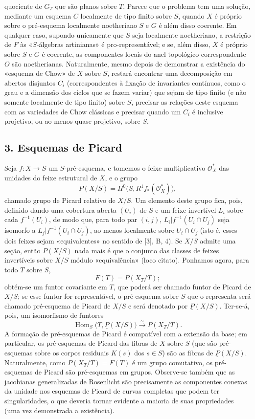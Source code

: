 \documentclass[11pt,twoside,openany]{book}
\numberwithin{equation}{section}
\newcommand{\src}[1]{%
  \phantomsection\hypertarget{src:#1}{}%
  \marginpar{\raggedleft\footnotesize\sffamily #1}%
}
\theoremstyle{plain}
\theoremstyle{definition}
\theoremstyle{remark}
\newcommand{\FgaUnitKey}{frontmatter}
\renewcommand{\src}[1]{%
  \phantomsection\hypertarget{src:\FgaUnitKey:#1}{}%
  \marginpar{\raggedleft\footnotesize\sffamily #1}%
}
\begin{document}
\src{383}
quociente de $G_T$ que são planos sobre $T$. Parece que o problema tem uma
solução, mediante um esquema $C$ localmente de tipo finito sobre $S$, quando
$X$ é próprio sobre o pré-esquema localmente noetheriano $S$ e $G$ é além disso
coerente. Em qualquer caso, supondo unicamente que $S$ seja localmente
noetheriano, a restrição de $F$ às «$S$-álgebras artinianas» é
pro-representável; e se, além disso, $X$ é próprio sobre $S$ e $G$ é coerente, as
componentes locais do anel topológico correspondente $O$ são
noetherianas. Naturalmente, mesmo depois de demonstrar a existência do
«esquema de Chow» de $X$ sobre $S$, restará
encontrar uma decomposição em abertos disjuntos $C_i$ (correspondentes à
fixação de invariantes contínuos, como o grau e a dimensão dos
ciclos que se fazem variar) que sejam de tipo finito (e não somente localmente de
tipo finito) sobre $S$, precisar as relações deste esquema com as
variedades de Chow clássicas e precisar quando um $C_i$ é inclusive projetivo,
ou ao menos quase-projetivo, sobre $S$.

\subsection*{3. Esquemas de Picard}

Seja $f:X\longrightarrow S$ um $S$-pré-esquema, e tomemos o feixe
multiplicativo $\mathcal O_X^*$ das unidades do feixe estrutural de $X$, e
o grupo
\[
  P(X/S)=H^0\bigl(S,R^1f_*(\mathcal O_X^*)\bigr),
\]
chamado grupo de Picard relativo de $X/S$. Um elemento deste grupo fica,
pois, definido dando uma cobertura aberta $(U_i)$ de $S$ e um feixe invertível
$L_i$ sobre cada $f^{-1}(U_i)$, de modo que, para todo par $(i,j)$,
$L_i|f^{-1}(U_i\cap U_j)$ seja isomorfo a $L_j|f^{-1}(U_i\cap U_j)$, ao menos
localmente sobre $U_i\cap U_j$ (isto é, esses dois feixes sejam «equivalentes»
no sentido de [3], B, 4). Se $X/S$ admite uma seção, então $P(X/S)$ nada mais
é que o conjunto das classes de feixes invertíveis sobre $X/S$ módulo
«equivalência» (loco citato). Ponhamos agora, para todo $T$ sobre $S$,
\[
  F(T)=P(X_T/T) ;
\]
obtém-se um funtor covariante em $T$, que poderá ser chamado funtor de Picard de
$X/S$; se esse funtor for representável, o pré-esquema sobre $S$ que o
representa será chamado pré-esquema de Picard de $X/S$ e será denotado por
$\underline P(X/S)$. Ter-se-á, pois, um isomorfismo de funtores
\[
  \operatorname{Hom}_S\bigl(T,\underline P(X/S)\bigr)
  \xrightarrow{\sim}P(X_T/T).
\]
A formação de pré-esquemas de Picard é compatível com a extensão da
base; em particular, os pré-esquemas de Picard das fibras de $X$ sobre $S$
(que são pré-esquemas sobre os corpos residuais $K(s)$ dos $s\in S$) são
as fibras de $\underline P(X/S)$. Naturalmente, como $P(X_T/T)=F(T)$ é um
grupo comutativo, os pré-esquemas de Picard são pré-esquemas em grupos.
Observe-se também que as jacobianas generalizadas de Rosenlicht são precisamente
as componentes conexas da unidade nos esquemas de Picard de curvas
completas que podem ter singularidades, o que deveria tornar evidente a
maioria de suas propriedades (uma vez demonstrada a existência).
\end{document}
